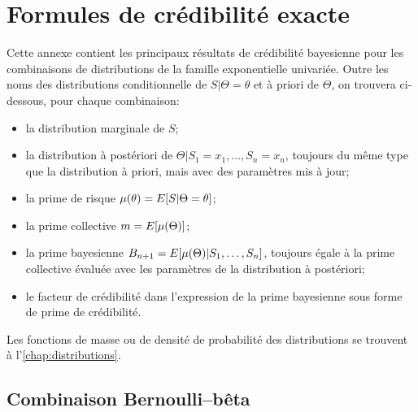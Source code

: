 \chapter{Formules de crédibilité exacte}
\label{chap:formules}

Cette annexe contient les principaux résultats de crédibilité
bayesienne pour les combinaisons de distributions de la famille
exponentielle univariée. Outre les noms des distributions
conditionnelle de $S|\Theta = \theta$ et à priori de $\Theta$, on
trouvera ci-dessous, pour chaque combinaison:
\begin{itemize}
\item la distribution marginale de $S$;
\item la distribution à postériori de
  $\Theta|S_1 = x_1, \dots, S_n = x_n$, toujours du même type que la
  distribution à priori, mais avec des paramètres mis à jour;
\item la prime de risque $\mu(\theta) = E [ S|\Theta = \theta ]$;
\item la prime collective $m = E [ \mu(\Theta) ]$;
\item la prime bayesienne
  $B_{n+1} = E [ \mu(\Theta)|S_1, \dots, S_n ]$, toujours égale à la
  prime collective évaluée avec les paramètres de la distribution à
  postériori;
\item le facteur de crédibilité dans l'expression de la prime
  bayesienne sous forme de prime de crédibilité.
\end{itemize}

Les fonctions de masse ou de densité de probabilité des distributions
se trouvent à l'\autoref{chap:distributions}.


\begingroup
{}

\section{Combinaison Bernoulli--bêta}

